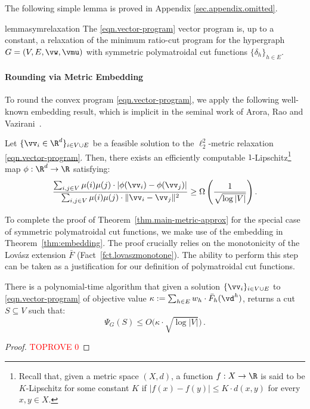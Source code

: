 \documentclass[letterpaper]{article}
\begin{document}
The following simple lemma is proved in Appendix \ref{sec.appendix.omitted}.

\begin{restatable}{lemma}{symrelaxation}
\label{lem.relaxation}
The \eqref{eqn.vector-program} vector program is, up to a constant, a relaxation of the minimum ratio-cut program for the hypergraph $G=(V,E,\vw,\vmu)$ with symmetric polymatroidal cut functions $\{\delta_h\}_{h \in E}.$
\end{restatable}

\paragraph{Rounding via Metric Embedding} To round the convex program \eqref{eqn.vector-program}, we apply the following well-known embedding result, which is implicit in the seminal work of Arora, Rao and Vazirani~\cite{ARV2009}.

\begin{theorem}
\label{thm:embedding}
Let $\{\vv_i \in \R^d \}_{i \in V \cup E}$ be a feasible solution to the $\ell_2^2$-metric relaxation \eqref{eqn.vector-program}. Then, there exists an efficiently computable $1$-Lipschitz\footnote{Recall that, given a metric space $(X,d)$, a function $f:X \to \R $ is said to be $K$-Lipschitz for some constant $K$ if $|f(x) - f(y)| \leq K\cdot d(x,y)$ for every $x,y \in X$.} map $\phi:\R^d \to \R$ satisfying:
$$
  \frac{\sum_{i, j \in V} \mu(i) \mu(j) \cdot |\phi(\vv_i)- \phi(\vv_j)|}
  {\sum_{i, j \in V} \mu(i) \mu(j) \cdot \|\vv_i - \vv_j\|^2}
  \geq \Omega \left(\frac{1}{\sqrt{\log |V|}}\right).
$$
\end{theorem}

To complete the proof of Theorem~\ref{thm.main-metric-approx} for the special case of symmetric polymatroidal cut functions, we make use of the embedding in Theorem~\ref{thm:embedding}. The proof crucially relies on the monotonicity of the Lov\'asz extension $\bar{F}$ (Fact~\ref{fct.lovaszmonotone}). The ability to perform this step can be taken as a justification for our definition of polymatroidal cut functions.

\begin{lemma}\label{lem.sqrt-logn-rounding-symmetric}
There is a polynomial-time algorithm that given a solution $\{\vv_i\}_{i \in V \cup E}$ to \eqref{eqn.vector-program} of objective value $\kappa :=  \sum_{h\in E} w_h \cdot \bar{F}_h(\vd^h)$, returns a cut $S \subseteq V$ such that:
\[
    \Psi_G(S) \leq O \big( \kappa \cdot \sqrt{\log |V|} \big) \, .
\]
\end{lemma}
\begin{proof}\textcolor{red}{TOPROVE 0}\end{proof}
 
\end{document}
